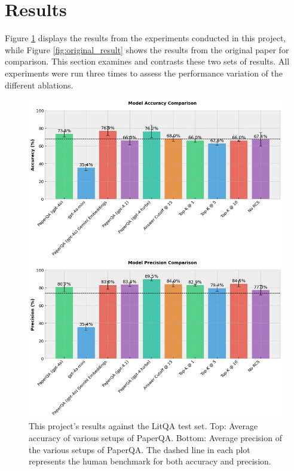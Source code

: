 \section{Results}
\label{sec:results}

Figure \ref{fig:main_result} displays the results from the experiments conducted in this project, while Figure \ref{fig:original_result} shows the results from the original paper for comparison. This section examines and contrasts these two sets of results. All experiments were run three times to assess the performance variation of the different ablations. 

\begin{figure}[H]
    \centering
    \includegraphics[width=\textwidth]{figures/main_result.png}
    \caption{This project's results against the LitQA test set. Top: Average accuracy of various setups of PaperQA. Bottom: Average precision of the various setups of PaperQA. The dashed line in each plot represents the human benchmark for both accuracy and precision.}
    \label{fig:main_result}
\end{figure}

